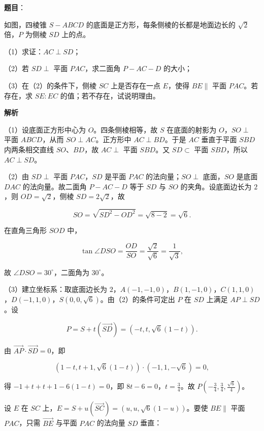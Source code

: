 \begin{answer}

\textbf{题目}：

如图，四棱锥 $S-ABCD$ 的底面是正方形，每条侧棱的长都是地面边长的 $\sqrt2$ 倍，$P$ 为侧棱 $SD$ 上的点。

（1）求证：$AC\perp SD$；

（2）若 $SD\perp$ 平面 $PAC$，求二面角 $P-AC-D$ 的大小；

（3）在（2）的条件下，侧棱 $SC$ 上是否存在一点 $E$，使得 $BE\parallel$ 平面 $PAC$。若存在，求 $SE:EC$ 的值；若不存在，试说明理由。
\nopagebreak[4]
\begin{center}\end{center}
\nopagebreak[4]
\textbf{解析}

（1）设底面正方形中心为 $O$。四条侧棱相等，故 $S$ 在底面的射影为 $O$，$SO\perp$ 平面 $ABCD$，从而 $SO\perp AC$。正方形中 $AC\perp BD$。于是 $AC$ 垂直于平面 $SBD$ 内两条相交直线 $SO$、$BD$，故 $AC\perp$ 平面 $SBD$。又 $SD\subset$ 平面 $SBD$，所以 $AC\perp SD$。

（2）由 $SD\perp$ 平面 $PAC$，$SD$ 是平面 $PAC$ 的法向量；$SO\perp$ 底面，$SO$ 是底面 $DAC$ 的法向量。故二面角 $P-AC-D$ 等于 $SD$ 与 $SO$ 的夹角。设底面边长为 $2$，则 $OD=\sqrt2$，侧棱 $SD=2\sqrt2$，故

\nopagebreak[4]
\[SO=\sqrt{SD^2-OD^2}=\sqrt{8-2}=\sqrt6 .\]

在直角三角形 $SOD$ 中，

\nopagebreak[4]
\[\tan\angle DSO=\frac{OD}{SO}=\frac{\sqrt2}{\sqrt6}=\frac1{\sqrt3},\]

故 $\angle DSO=30^\circ$，二面角为 $30^\circ$。

（3）建立坐标系：取底面边长为 $2$，$A(-1,-1,0)$，$B(1,-1,0)$，$C(1,1,0)$，$D(-1,1,0)$，$S(0,0,\sqrt6)$。由（2）的条件可定出 $P$ 在 $SD$ 上满足 $AP\perp SD$。设

\nopagebreak[4]
\[P=S+t(\overrightarrow{SD})=(-t,t,\sqrt6(1-t)) .\]

由 $\overrightarrow{AP}\cdot\overrightarrow{SD}=0$，即

\nopagebreak[4]
\[(1-t,t+1,\sqrt6(1-t))\cdot(-1,1,-\sqrt6)=0,\]

得 $-1+t+t+1-6(1-t)=0$，即 $8t-6=0$，$t=\frac34$。故 $P\left(-\frac34,\frac34,\frac{\sqrt6}{4}\right)$。

设 $E$ 在 $SC$ 上，$E=S+u(\overrightarrow{SC})=(u,u,\sqrt6(1-u))$。要使 $BE\parallel$ 平面 $PAC$，只需 $\overrightarrow{BE}$ 与平面 $PAC$ 的法向量 $SD$ 垂直：


\end{answer}
